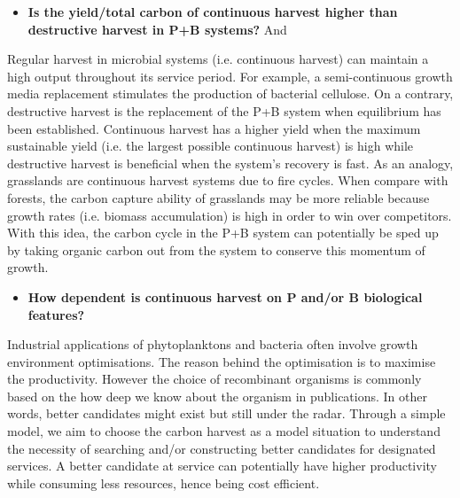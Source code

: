\documentclass[../thesis.tex]{subfiles} %
\begin{document}
\begin{itemize}
    \item \textbf{
    Is the yield/total carbon of continuous harvest higher than destructive harvest in P+B systems?
    } And
\end{itemize}

Regular harvest in microbial systems (i.e. continuous harvest) can maintain a high output throughout its service period.  For example, a semi-continuous growth media replacement stimulates the production of bacterial cellulose.\autocite{aytekin2016statistical}  On a contrary, destructive harvest is the replacement of the P+B system when equilibrium has been established.  Continuous harvest has a higher yield when the maximum sustainable yield (i.e. the largest possible continuous harvest) is high while destructive harvest is beneficial when the system's recovery is fast.  As an analogy, grasslands are continuous harvest systems due to fire cycles.  When compare with forests, the carbon capture ability of grasslands may be more reliable\autocite{dass2018grasslands} because growth rates (i.e. biomass accumulation) is high in order to win over competitors.  With this idea, the carbon cycle in the P+B system can potentially be sped up by taking organic carbon out from the system to conserve this momentum of growth.

\begin{itemize}
    \item \textbf{
    How dependent is continuous harvest on P and/or B biological features?
    }
\end{itemize}

Industrial applications of phytoplanktons and bacteria often involve growth environment optimisations.\autocite{dash2013marine,naik2013lead,huang2012industrial,evanson_2019}  The reason behind the optimisation is to maximise the productivity.  However the choice of recombinant organisms is commonly based on the how deep we know about the organism in publications.\autocite{huang2012industrial}  In other words, better candidates might exist but still under the radar.  Through a simple model, we aim to choose the carbon harvest as a model situation to understand the necessity of searching and/or constructing better candidates for designated services.  A better candidate at service can potentially have higher productivity while consuming less resources, hence being cost efficient.
\end{document}
